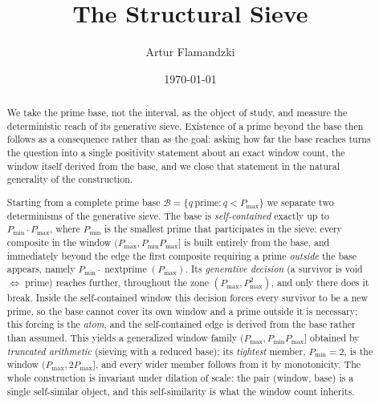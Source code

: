 \documentclass[11pt,a4paper]{amsart}
\title{The Structural Sieve}
\author{Artur Flamandzki}
\date{\today}
\theoremstyle{plain}
\theoremstyle{definition}
\theoremstyle{plain}
\theoremstyle{remark}
\begin{document}
\begin{abstract}
We take the prime base, not the interval, as the object of study, and measure the
deterministic reach of its generative sieve. Existence of a prime beyond the base then
follows as a consequence rather than as the goal: asking how far the base reaches turns
the question into a single positivity statement about an exact window count, the window
itself derived from the base, and we close that statement in the natural generality of
the construction.

Starting from a complete prime base $\mathcal{B}=\{q\ \text{prime}: q<P_{\max}\}$ we
separate two determinisms of the generative sieve. The base is \emph{self-contained}
exactly up to $P_{\min}\cdot P_{\max}$, where $P_{\min}$ is the smallest prime that
participates in the sieve: every composite in the window $(P_{\max}, P_{\min}P_{\max}]$ is
built entirely from the base, and immediately beyond the edge the first composite requiring
a prime \emph{outside} the base appears, namely $P_{\min}\cdot\operatorname{nextprime}(P_{\max})$.
Its \emph{generative decision} (a survivor is void $\Leftrightarrow$ prime) reaches
further, throughout the zone $(P_{\max}, P_{\max}^2)$, and only there does it break. Inside the
self-contained window this decision forces every survivor to be a new prime, so the base
cannot cover its own window and a prime outside it is necessary; this forcing is the
\emph{atom}, and the self-contained edge is derived from the base rather than assumed. This yields a generalized window
family $(P_{\max}, P_{\min}P_{\max}]$ obtained by \emph{truncated arithmetic}
(sieving with a reduced base); its \emph{tightest} member, $P_{\min}=2$, is the window
$(P_{\max}, 2P_{\max}]$, and every wider member follows from it by
monotonicity. The whole construction is invariant under dilation of scale: the pair
(window, base) is a single self-similar object, and this self-similarity is what the
window count inherits.


\end{abstract}
\end{document}
